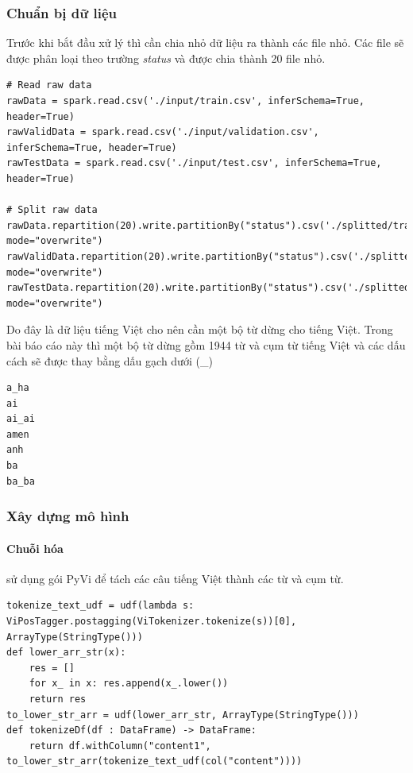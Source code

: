 \documentclass[runningheads]{llncs}
\begin{document}
\subsubsection{Chuẩn bị dữ liệu}

Trước khi bắt đầu xử lý thì cần chia nhỏ dữ liệu ra thành các file nhỏ. Các file sẽ được phân loại theo trường \textit{status} và được chia thành 20 file nhỏ.

\begin{lstlisting}
# Read raw data
rawData = spark.read.csv('./input/train.csv', inferSchema=True, header=True)
rawValidData = spark.read.csv('./input/validation.csv', inferSchema=True, header=True)
rawTestData = spark.read.csv('./input/test.csv', inferSchema=True, header=True)

# Split raw data
rawData.repartition(20).write.partitionBy("status").csv('./splitted/train', mode="overwrite")
rawValidData.repartition(20).write.partitionBy("status").csv('./splitted/valid', mode="overwrite")
rawTestData.repartition(20).write.partitionBy("status").csv('./splitted/test', mode="overwrite")
\end{lstlisting}

Do đây là dữ liệu tiếng Việt cho nên cần một bộ từ dừng cho tiếng Việt. Trong bài báo cáo này thì một bộ từ dừng gồm 1944 từ và cụm từ tiếng Việt và các dấu cách sẽ được thay bằng dấu gạch dưới (\_)

\begin{lstlisting}
a_ha
ai
ai_ai
amen
anh
ba
ba_ba
\end{lstlisting}

\subsubsection{Xây dựng mô hình}

\paragraph{Chuỗi hóa} sử dụng gói PyVi để tách các câu tiếng Việt thành các từ và cụm từ.

\begin{lstlisting}
tokenize_text_udf = udf(lambda s: ViPosTagger.postagging(ViTokenizer.tokenize(s))[0], ArrayType(StringType()))
def lower_arr_str(x):
    res = []
    for x_ in x: res.append(x_.lower())
    return res
to_lower_str_arr = udf(lower_arr_str, ArrayType(StringType()))
def tokenizeDf(df : DataFrame) -> DataFrame:
    return df.withColumn("content1", to_lower_str_arr(tokenize_text_udf(col("content"))))
\end{lstlisting}
\end{document}
